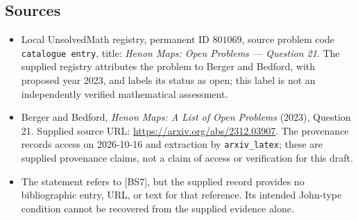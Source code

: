 \documentclass[11pt]{article}
\begin{document}
\subsection{Sources}
\begin{itemize}
\item Local UnsolvedMath registry, permanent ID \(801069\), source problem code \texttt{catalogue entry}, title: \emph{Henon Maps: Open Problems --- Question 21}. The supplied registry attributes the problem to Berger and Bedford, with proposed year 2023, and labels its status as open; this label is not an independently verified mathematical assessment.
\item Berger and Bedford, \emph{Henon Maps: A List of Open Problems} (2023), Question 21. Supplied source URL: \url{https://arxiv.org/abs/2312.03907}. The provenance records access on 2026-10-16 and extraction by \texttt{arxiv\_latex}; these are supplied provenance claims, not a claim of access or verification for this draft.
\item The statement refers to [BS7], but the supplied record provides no bibliographic entry, URL, or text for that reference. Its intended John-type condition cannot be recovered from the supplied evidence alone.
\end{itemize}
\end{document}
